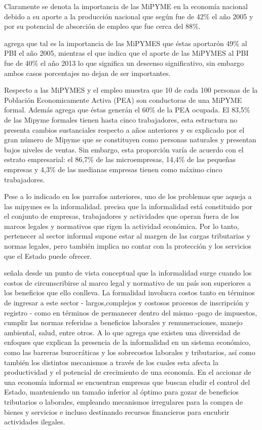 Claramente se denota la importancia de las MiPYME en la econom\'ia nacional debido a su aporte a la
producci\'on nacional que seg\'un \citep{arbulu} fue de 42\% el a\~no 2005 y por
su potencial de absorci\'on de empleo que fue cerca del 88\%.

\cite{arbulu} agrega que tal es la importancia de las MiPYMES que \'estas aportar\'on
49\% al PBI el a\~no 2005, mientras el que \citep{produce} indica que el aporte
de las MiPYMES al PBI fue de 40\% el a\~no 2013 lo que significa un descenso significativo,
sin embargo ambos casos porcentajes no dejan de ser importantes.

Respecto a las MiPYMES y el empleo \cite{produce2} muestra que 10 de cada 100 personas
de la Poblaci\'on Economicamente Activa (PEA) son conductoras de una MiPYME formal.
Adem\'as agrega que \'estas gener\'an el 60\% de la PEA ocupada. El 83,5\% de las
Mipyme formales tienen hasta cinco trabajadores, esta estructura no presenta cambios
sustanciales respecto a a\~nos anteriores y es explicado por el gran n\'umero de
Mipyme que se constituyen como personas naturales y presentan bajos niveles de
ventas. Sin embargo, esta proporci\'on var\'ia de acuerdo con el estrato empresarial:
el 86,7\% de las microempresas, 14,4\% de las peque\~nas empresas y 4,3\% de las
medianas empresas tienen como m\'aximo cinco trabajadores.

Pese a lo indicado en los parrafos anteriores, uno de los problemas que aqueja a
las mipymes es la informalidad. \cite{loayza} precisa que la informalidad est\'a
constituido por el conjunto de empresas, trabajadores y actividades que operan
fuera de los marcos legales y normativos que rigen la actividad econ\'omica. Por
lo tanto, pertenecer al sector informal supone estar al margen de las cargas
tributarias y normas legales, pero tambi\'en implica no  contar  con  la  protecci\'on
y los servicios que el Estado  puede  ofrecer.

\cite{loayza} se\~nala desde un punto de vista conceptual que la informalidad surge
cuando los costos de circunscribirse al marco legal y normativo de un pa\'is son
superiores a los beneficios que ello conlleva. La formalidad involucra costos
tanto en t\'erminos de ingresar a este sector - largos,complejos y costosos procesos
de inscripci\'on y registro - como en t\'erminos de permanecer dentro del mismo -pago
de impuestos, cumplir las normas referidas a beneficios laborales
y remuneraciones, manejo ambiental, salud, entre otros. A lo que \citep{penaranda}
agrega que existen una diversidad de enfoques que explican la presencia de la
informalidad en un sistema econ\'omico, como las barreras burocr\'aticas y los sobrecostos
laborales y tributarios, as\'i como tambi\'en los distintos mecanismos a trav\'es de
los cuales esta afecta la productividad y el potencial de crecimiento de una
econom\'ia. En el accionar de una econom\'ia informal se encuentran empresas que
buscan eludir el control del Estado, manteniendo un tama\~no inferior al \'optimo
para gozar de beneficios tributarios o laborales, empleando mecanismos irregulares
para la compra de bienes y servicios e incluso destinando recursos financieros
para encubrir actividades ilegales.

